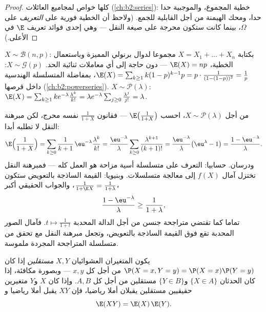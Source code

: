 \begin{proof}
كلها خواص لمجاميع العائلات  (\cref{ch:b2:series}): خطية المجموع،
والموجبية حدا حدا، ومحك الهيمنة من أجل القابلية للجمع. (ولاحظ أن
الخطية فورية على \emph{التعريف} على $\Omega$، بينما كانت ستكون محرجة
على صيغة النقل --- وهي إحدى فوائد تعريف $\E$ في الأعلى.)
\end{proof}

\begin{example}\label{ex:b2:randomvar:expectations}
$X \sim \mathcal{B}(n, p)$: بكتابة $X = X_1 + \dots + X_n$ مجموعا لدوال برنولي المميزة وباستعمال الخطية،
$\E(X) = np$ --- دون حاجة إلى أي معاملات ثنائية الحد. $X \sim \mathcal{G}(p)$: $\E(X) =
\sum_{k\geq1}k(1-p)^{k-1}p = p\cdot\frac{1}{(1 - (1-p))^2} =
\frac1p$،
بمفاضلة المتسلسلة الهندسية داخل قرصها (\cref{ch:b2:powerseries}). $X \sim \mathcal{P}(\lambda)$: $\E(X)
= \sum_{k\geq1}k e^{-\lambda}\frac{\lambda^k}{k!} = \lambda
e^{-\lambda}\sum_{j\geq0}\frac{\lambda^j}{j!} = \lambda$.
\end{example}

\begin{example}\label{ex:b2:randomvar:transferex}
من أجل $X \sim \mathcal P(\lambda)$، احسب $\E\bigl(\frac1{1+X}\bigr)$ --- فقانون $\frac1{1+X}$ نفسه محرج، لكن مبرهنة
النقل لا تطلبه أبدا:
\[
\E\Bigl(\frac1{1+X}\Bigr)
= \sum_{k\geq0}\frac{1}{k+1}\,\eu^{-\lambda}
\frac{\lambda^k}{k!}
= \frac{\eu^{-\lambda}}{\lambda}\sum_{k\geq0}
\frac{\lambda^{k+1}}{(k+1)!}
= \frac{\eu^{-\lambda}}{\lambda}\bigl(\eu^\lambda - 1\bigr)
= \frac{1 - \eu^{-\lambda}}{\lambda} .
\]
ودرسان. حسابيا: التعرف على متسلسلة أسية مزاحة هو العمل كله ---
فمبرهنة النقل تختزل آمال $f(X)$ إلى معالجة متسلسلات. وبنيويا: القيمة
الساذجة بالتعويض ستكون $\frac1{1 + \E X} =
\frac1{1 + \lambda}$، والجواب الحقيقي أكبر،
\[
\frac{1 - \eu^{-\lambda}}{\lambda} \geq
\frac{1}{1 + \lambda},
\]
تماما كما تقتضي متراجحة جنسن من أجل الدالة المحدبة $t
\mapsto \frac1{1+t}$. فآمال
الصور المحدبة تقع فوق القيمة الساذجة بالتعويض، وتجعل مبرهنة النقل مع
تحقق من متسلسلة المتراجحة المجردة ملموسة.
\end{example}

\begin{theorem}\label{thm:b2:randomvar:product}
يكون المتغيران العشوائيان $X, Y$ \emph{مستقلين} إذا كان $\P(X = x, Y =
y) = \P(X = x)\P(Y = y)$ من
أجل كل $x, y$ --- وبصورة مكافئة، إذا كان الحدثان $\{X \in A\}$ و$\{Y \in B\}$
مستقلين من أجل كل $A,
B$. وإذا كان $X$ و$Y$ متغيرين حقيقيين
مستقلين يقبلان أملا رياضيا، فإن $XY$ يقبل أملا رياضيا و
\[
\E(XY) = \E(X)\,\E(Y) .
\]
\end{theorem}

